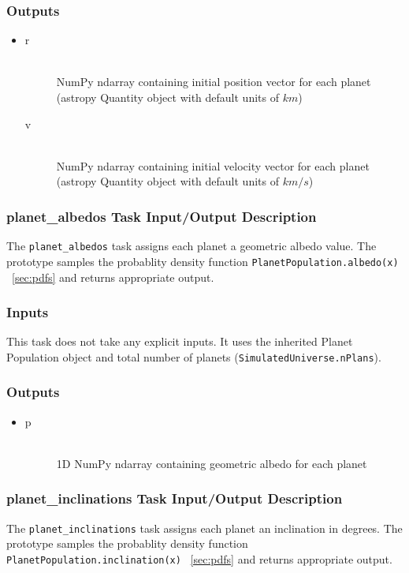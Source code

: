 \documentclass[cleanfoot]{asme2ej}
\begin{document}
\subsubsection*{Outputs}
\begin{itemize}
    \item 
    \begin{description}
        \item[r] \hfill \\
        NumPy ndarray containing initial position vector for each planet (astropy Quantity object with default units of $ km $)
        \item[v] \hfill \\
        NumPy ndarray containing initial velocity vector for each planet (astropy Quantity object with default units of $ km/s $)
    \end{description}
\end{itemize}

\subsubsection{planet\_albedos Task Input/Output Description} \label{sec:planetalbedostask}
The \verb+planet_albedos+ task assigns each planet a geometric albedo value. The prototype samples the probablity density function \verb+PlanetPopulation.albedo(x)+ ~\ref{sec:pdfs} and returns appropriate output.

\subsubsection*{Inputs}
This task does not take any explicit inputs.  It uses the inherited Planet Population object and total number of planets (\verb+SimulatedUniverse.nPlans+).

\subsubsection*{Outputs}
\begin{itemize}
    \item 
    \begin{description}
        \item[p] \hfill \\
        1D NumPy ndarray containing geometric albedo for each planet 
    \end{description}
\end{itemize}

\subsubsection{planet\_inclinations Task Input/Output Description} \label{sec:planetinclinationstask}
The \verb+planet_inclinations+ task assigns each planet an inclination in degrees. The prototype samples the probablity density function \verb+PlanetPopulation.inclination(x)+ ~\ref{sec:pdfs} and returns appropriate output.
\end{document}
